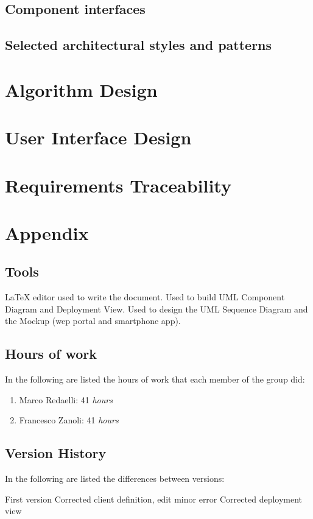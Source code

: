 \documentclass{../Common/Structure/doc_pdf}
\begin{document}
\section{Component interfaces}

\section{Selected architectural styles and patterns}


\chapter{Algorithm Design}

\chapter{User Interface Design}

\chapter{Requirements Traceability}


\appendix
\chapter{Appendix}

\section{Tools}
\begin{itemize}
	 \LaTeX{} editor used to write the document.
	 Used to build UML Component Diagram and Deployment View.
	 Used to design the UML Sequence Diagram and the Mockup (wep portal and smartphone app).
\end{itemize}
\newpage
\section{Hours of work}
In the following are listed the hours of work that each member of the group did:
\begin{enumerate}
	\item Marco Redaelli: 41 \emph{hours}
	\item Francesco Zanoli: 41 \emph{hours}
\end{enumerate}
\newpage
\section{Version History}
In the following are listed the differences between versions:
\begin{enumerate}
	 First version
	 Corrected client definition, edit minor error
	 Corrected deployment view
\end{enumerate}
\end{document}
